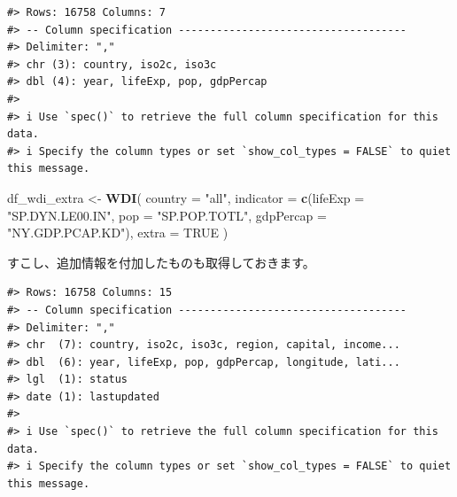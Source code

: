 \documentclass[
  xelatex, ja=standard]{bxjsbook}
\newenvironment{Shaded}{\begin{snugshade}}{\end{snugshade}}
\newcommand{\AttributeTok}[1]{\textcolor[rgb]{0.13,0.29,0.53}{#1}}
\newcommand{\ConstantTok}[1]{\textcolor[rgb]{0.56,0.35,0.01}{#1}}
\newcommand{\FunctionTok}[1]{\textcolor[rgb]{0.13,0.29,0.53}{\textbf{#1}}}
\newcommand{\NormalTok}[1]{#1}
\newcommand{\OtherTok}[1]{\textcolor[rgb]{0.56,0.35,0.01}{#1}}
\newcommand{\StringTok}[1]{\textcolor[rgb]{0.31,0.60,0.02}{#1}}
\theoremstyle{definition}
\theoremstyle{definition}
\theoremstyle{definition}
\theoremstyle{definition}
\theoremstyle{remark}
\begin{document}
\begin{verbatim}
#> Rows: 16758 Columns: 7
#> -- Column specification ------------------------------------
#> Delimiter: ","
#> chr (3): country, iso2c, iso3c
#> dbl (4): year, lifeExp, pop, gdpPercap
#> 
#> i Use `spec()` to retrieve the full column specification for this data.
#> i Specify the column types or set `show_col_types = FALSE` to quiet this message.
\end{verbatim}

\begin{Shaded}
\begin{Highlighting}[]
\NormalTok{df\_wdi\_extra }\OtherTok{\textless{}{-}} \FunctionTok{WDI}\NormalTok{(}
  \AttributeTok{country =} \StringTok{"all"}\NormalTok{, }
  \AttributeTok{indicator =} \FunctionTok{c}\NormalTok{(}\AttributeTok{lifeExp =} \StringTok{"SP.DYN.LE00.IN"}\NormalTok{, }\AttributeTok{pop =} \StringTok{"SP.POP.TOTL"}\NormalTok{, }\AttributeTok{gdpPercap =} \StringTok{"NY.GDP.PCAP.KD"}\NormalTok{), }
  \AttributeTok{extra =} \ConstantTok{TRUE}
\NormalTok{)}
\end{Highlighting}
\end{Shaded}

すこし、追加情報を付加したものも取得しておきます。

\begin{verbatim}
#> Rows: 16758 Columns: 15
#> -- Column specification ------------------------------------
#> Delimiter: ","
#> chr  (7): country, iso2c, iso3c, region, capital, income...
#> dbl  (6): year, lifeExp, pop, gdpPercap, longitude, lati...
#> lgl  (1): status
#> date (1): lastupdated
#> 
#> i Use `spec()` to retrieve the full column specification for this data.
#> i Specify the column types or set `show_col_types = FALSE` to quiet this message.
\end{verbatim}
\end{document}
